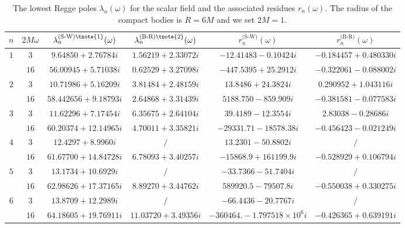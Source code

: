 \documentclass[aps,prd,longbibliography,reprint,twocolumn,amsmath,amssymb,amsfonts,showpacs,superscriptaddress]{revtex4-1}%
\begin{document}
\begingroup
\squeezetable
\begin{table}[htp]
\begin{threeparttable}[htp]
\caption{\label{tab:table1} The lowest Regge poles $\lambda_{n}(\omega)$ for the scalar field and the associated residues $r_{n}(\omega)$. The radius of the compact bodies is $R = 6M$ and we set $2M=1$.}
\smallskip
\centering
\begin{ruledtabular}
\begin{tabular}{cccccc}
 $n$ & $2 M \omega$  & $\lambda^{\text{(S-W)\tnote{1}}}_n(\omega)$ & $\lambda^{\text{(B-R)\tnote{2}}}_n(\omega)$ & $r^{\text{(S-W)}}_{n}(\omega)$ & $r^{\text{(B-R)}}_{n}(\omega)$
 \\ \hline
$1$  & $3$  & $ 9.64850+2.76784 i$  & $1.56219+2.33072 i$  & $-12.41483-0.10424 i$  & $ -0.184457+0.480330 i$    \\
     & $16$  & $56.00945+5.71038 i$  & $ 0.62529+3.27098 i$  & $-447.5395+25.2912 i$  & $-0.322061-0.088002 i $  \\

$2$  & $3$  & $ 10.71986+5.16209 i $  & $3.81484+2.48159 i$  & $13.8486+24.3824 i$  & $0.290952+1.043116 i$    \\
     & $16$  & $ 58.442656+9.18793 i$ & $2.64868+3.31439 i$  & $5188.750-859.909 i$  & $ -0.381581-0.077583 i$    \\

$3$  & $3$  & $11.62296+7.17454 i$  & $ 6.35675+2.64104 i$  & $39.4189-12.3554 i$ & $2.83038-0.28686 i$    \\
     & $16$  & $60.20374+12.14965 i$  & $4.70011+3.35821 i$  & $-29331.71-18578.38 i$  & $-0.456423-0.021249 i$ \\

$4$  & $3$  & $ 12.4297+8.9960 i$  & $/$  & $ 13.2301-50.8802 i$ & $/$    \\
     & $16$  & $ 61.67700+14.84728 i $  & $6.78093+3.40257 i$  & $-15868.9+161199.9 i$  & $-0.528929+0.106794 i$ \\

$5$  & $3$  & $13.1734+10.6929 i$  & $/$  & $-33.7366-51.7404 i$ & $/$     \\
     & $16$  & $62.98626+17.37165 i$  & $8.89270+3.44762 i$  & $589920.5-79507.8 i$  & $-0.550038+0.330275 i$    \\

$6$  & $3$  & $13.8709+12.2989 i$  & $/$   & $-66.4436-20.7767 i$ & $/$    \\
     & $16$  & $ 64.18605+19.76911 i$  & $11.03720+3.49356 i$  & $-360464.-1.797518\times 10^6 i$  & $ -0.426365+0.639191 i$    \\


\end{tabular}
\end{ruledtabular}
\end{threeparttable}
\end{table}
\end{document}
